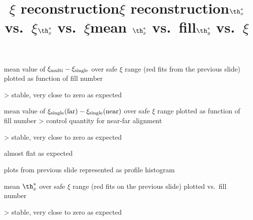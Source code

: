 \newpage %
\title{$\xi$ reconstruction}

\> mean value of $\xi_{\rm multi} - \xi_{\rm single}$ over safe $\xi$ range (red fits from the previous slide) plotted as function of fill number

\centerline{}

\>> stable, very close to zero as expected


\newpage %
\title{$\xi$ reconstruction}

\> mean value of $\xi_{\rm single}(\hbox{far}) - \xi_{\rm single}(\hbox{near})$ over safe $\xi$ range plotted as function of fill number
\>> control quantity for near-far alignment

\centerline{}

\>> stable, very close to zero as expected


\newpage %
\title{$\th^*_x$ vs.~$\xi$}

\centerline{}

\> almost flat as expected


\newpage %
\title{$\th^*_x$ vs.~$\xi$}

\> plots from previous slide represented as profile histogram

\centerline{}

\newpage %
\title{mean $\th^*_x$ vs.~fill}

\> mean $\th^*_x$ over safe $\xi$ range (red fits on the previous slide) plotted vs.~fill number

\centerline{}

\>> stable, very close to zero as expected



\newpage %
\title{$\th^*_y$ vs.~$\xi$}

\centerline{}

